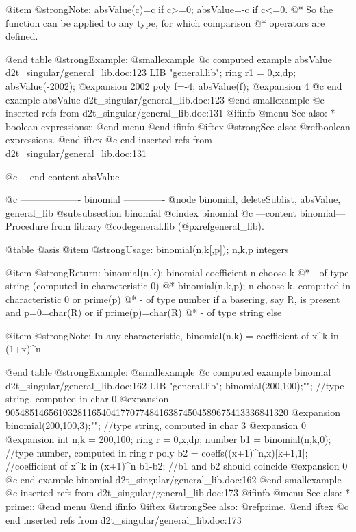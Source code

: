 @item @strong{Note:}
absValue(c)=c if c>=0; absValue=-c if c<=0.
@* So the function can be applied to any type, for which comparison
@* operators are defined.

@end table
@strong{Example:}
@smallexample
@c computed example absValue d2t_singular/general_lib.doc:123 
LIB "general.lib";
ring r1 = 0,x,dp;
absValue(-2002);
@expansion{} 2002
poly f=-4;
absValue(f);
@expansion{} 4
@c end example absValue d2t_singular/general_lib.doc:123
@end smallexample
@c inserted refs from d2t_singular/general_lib.doc:131
@ifinfo
@menu
See also:
* boolean expressions::
@end menu
@end ifinfo
@iftex
@strong{See also:}
@ref{boolean expressions}.
@end iftex
@c end inserted refs from d2t_singular/general_lib.doc:131

@c ---end content absValue---

@c ------------------- binomial -------------
@node binomial, deleteSublist, absValue, general_lib
@subsubsection binomial
@cindex binomial
@c ---content binomial---
Procedure from library @code{general.lib} (@pxref{general_lib}).

@table @asis
@item @strong{Usage:}
binomial(n,k[,p]); n,k,p integers

@item @strong{Return:}
binomial(n,k); binomial coefficient n choose k
@* - of type string (computed in characteristic 0)
@* binomial(n,k,p); n choose k, computed in characteristic 0 or prime(p)
@* - of type number if a basering, say R, is present and p=0=char(R)
or if prime(p)=char(R)
@* - of type string else

@item @strong{Note:}
In any characteristic, binomial(n,k) = coefficient of x^k in (1+x)^n

@end table
@strong{Example:}
@smallexample
@c computed example binomial d2t_singular/general_lib.doc:162 
LIB "general.lib";
binomial(200,100);"";                   //type string, computed in char 0
@expansion{} 90548514656103281165404177077484163874504589675413336841320
@expansion{} 
binomial(200,100,3);"";                 //type string, computed in char 3
@expansion{} 0
@expansion{} 
int n,k = 200,100;
ring r = 0,x,dp;
number b1 = binomial(n,k,0);            //type number, computed in ring r
poly b2 = coeffs((x+1)^n,x)[k+1,1];     //coefficient of x^k in (x+1)^n
b1-b2;                                  //b1 and b2 should coincide
@expansion{} 0
@c end example binomial d2t_singular/general_lib.doc:162
@end smallexample
@c inserted refs from d2t_singular/general_lib.doc:173
@ifinfo
@menu
See also:
* prime::
@end menu
@end ifinfo
@iftex
@strong{See also:}
@ref{prime}.
@end iftex
@c end inserted refs from d2t_singular/general_lib.doc:173

